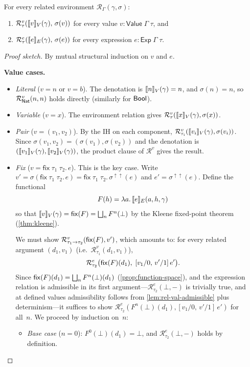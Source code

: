 \begin{theorem}
\label{thm:fundamental-lemma}
For every related environment $\mathcal{R}_\Gamma(\gamma, \sigma)$:
\begin{enumerate}
  \item $\mathcal{R}^v_\tau(\llbracket v \rrbracket_V(\gamma),\, \sigma(v))$ for every
    value $v : \mathsf{Value}\;\Gamma\;\tau$, and
  \item $\mathcal{R}^e_\tau(\llbracket e \rrbracket_E(\gamma),\, \sigma(e))$ for every
    expression $e : \mathsf{Exp}\;\Gamma\;\tau$.
\end{enumerate}
\end{theorem}
\begin{proof}[Proof sketch]
By mutual structural induction on $v$ and $e$.

\medskip\noindent
\textbf{Value cases.}
\begin{itemize}
  \item \emph{Literal} ($v = n$ or $v = b$).  The denotation is
    $\llbracket n \rrbracket_V(\gamma) = n$, and $\sigma(n) = n$, so
    $\mathcal{R}^v_{\mathsf{Nat}}(n, n)$ holds directly (similarly for $\mathsf{Bool}$).

  \item \emph{Variable} ($v = x$).  The environment relation gives
    $\mathcal{R}^v_\tau(\llbracket x \rrbracket_V(\gamma), \sigma(x))$.

  \item \emph{Pair} ($v = (v_1, v_2)$).  By the IH on each component,
    $\mathcal{R}^v_{\tau_i}(\llbracket v_i \rrbracket_V(\gamma), \sigma(v_i))$.  Since
    $\sigma(v_1, v_2) = (\sigma(v_1), \sigma(v_2))$ and the denotation
    is $(\llbracket v_1 \rrbracket_V(\gamma), \llbracket v_2 \rrbracket_V(\gamma))$, the product clause
    of $\mathcal{R}^v$ gives the result.

  \item \emph{Fix} ($v = \mathsf{fix}\;\tau_1\;\tau_2.\,e$).  This is
    the key case.  Write
    $v' = \sigma(\mathsf{fix}\;\tau_1\;\tau_2.\,e)
    = \mathsf{fix}\;\tau_1\;\tau_2.\,\sigma^{\uparrow\uparrow}(e)$
    and $e' = \sigma^{\uparrow\uparrow}(e)$.  Define the functional
    \[
      F(h) = \lambda a.\, \llbracket e \rrbracket_E(a, h, \gamma)
    \]
    so that $\llbracket v \rrbracket_V(\gamma) = \mathsf{fix}(F) = \bigsqcup_n F^n(\bot)$ by
    the Kleene fixed-point theorem (\cref{thm:kleene}).

    We must show $\mathcal{R}^v_{\tau_1 \to \tau_2}(\mathsf{fix}(F), v')$,
    which amounts to: for every related argument $(d_1, v_1)$
    (i.e.\ $\mathcal{R}^v_{\tau_1}(d_1, v_1)$),
    \[
      \mathcal{R}^e_{\tau_2}\bigl(\mathsf{fix}(F)(d_1),\;
      [v_1/0,\, v'/1]\,e'\bigr).
    \]
    Since $\mathsf{fix}(F)(d_1) = \bigsqcup_n F^n(\bot)(d_1)$
    (\cref{prop:function-space}), and the expression relation is
    admissible in its first argument---$\mathcal{R}^e_{\tau_2}(\bot, -)$
    is trivially true, and at defined values admissibility follows from
    \cref{lem:rel-val-admissible} plus determinism---it suffices to
    show $\mathcal{R}^e_{\tau_2}(F^n(\bot)(d_1), [v_1/0,\, v'/1]\,e')$
    for all~$n$.  We proceed by induction on~$n$:
    \begin{itemize}
      \item \emph{Base case} ($n = 0$): $F^0(\bot)(d_1) = \bot$, and
        $\mathcal{R}^e_{\tau_2}(\bot, -)$ holds by definition.


\end{itemize}
\end{itemize}
\end{proof}
